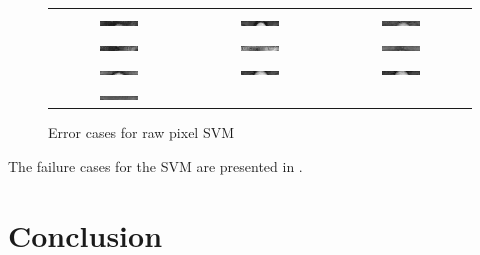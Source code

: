 \documentclass[12pt]{article}
\begin{document}
\begin{figure}
  \begin{tabular} {  c  c  c  }
    \includegraphics[width=0.3\textwidth]{img/fail-0.png} &
    \includegraphics[width=0.3\textwidth]{img/fail-1.png} &
    \includegraphics[width=0.3\textwidth]{img/fail-2.png} \\
    \includegraphics[width=0.3\textwidth]{img/fail-3.png} &
    \includegraphics[width=0.3\textwidth]{img/fail-4.png} &
    \includegraphics[width=0.3\textwidth]{img/fail-5.png} \\
    \includegraphics[width=0.3\textwidth]{img/fail-6.png} &
    \includegraphics[width=0.3\textwidth]{img/fail-7.png} &
    \includegraphics[width=0.3\textwidth]{img/fail-8.png} \\
    \includegraphics[width=0.3\textwidth]{img/fail-9.png} &
    &
    \\
  \end{tabular}

  \caption{Error cases for raw pixel SVM}
  \label{fig:fail}
\end{figure}


The failure cases for the SVM are presented in .

\section{Conclusion}
\label{sec:conclusion}
\end{document}
